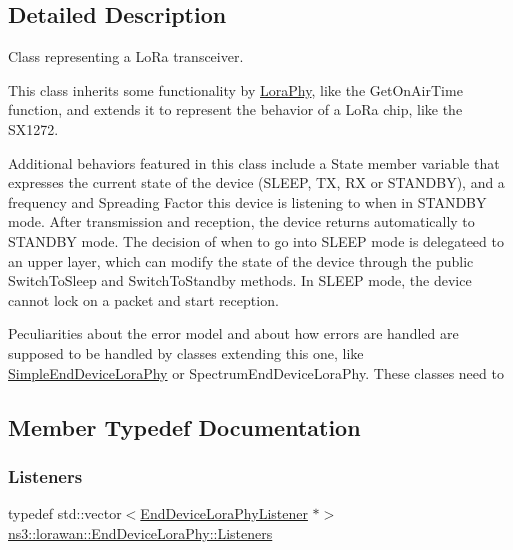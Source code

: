 \subsection{Detailed Description}
Class representing a Lo\+Ra transceiver.

This class inherits some functionality by \hyperlink{classns3_1_1lorawan_1_1LoraPhy}{Lora\+Phy}, like the Get\+On\+Air\+Time function, and extends it to represent the behavior of a Lo\+Ra chip, like the S\+X1272.

Additional behaviors featured in this class include a State member variable that expresses the current state of the device (S\+L\+E\+EP, TX, RX or S\+T\+A\+N\+D\+BY), and a frequency and Spreading Factor this device is listening to when in S\+T\+A\+N\+D\+BY mode. After transmission and reception, the device returns automatically to S\+T\+A\+N\+D\+BY mode. The decision of when to go into S\+L\+E\+EP mode is delegateed to an upper layer, which can modify the state of the device through the public Switch\+To\+Sleep and Switch\+To\+Standby methods. In S\+L\+E\+EP mode, the device cannot lock on a packet and start reception.

Peculiarities about the error model and about how errors are handled are supposed to be handled by classes extending this one, like \hyperlink{classns3_1_1lorawan_1_1SimpleEndDeviceLoraPhy}{Simple\+End\+Device\+Lora\+Phy} or Spectrum\+End\+Device\+Lora\+Phy. These classes need to 

\subsection{Member Typedef Documentation}
\mbox{\label{classns3_1_1lorawan_1_1EndDeviceLoraPhy_a2d6703f5ff4138f1a45afd26ec6223d9}} 
\subsubsection{\texorpdfstring{Listeners}{Listeners}}
{\footnotesize\ttfamily typedef std\+::vector$<$\hyperlink{classns3_1_1lorawan_1_1EndDeviceLoraPhyListener}{End\+Device\+Lora\+Phy\+Listener} $\ast$$>$ \hyperlink{classns3_1_1lorawan_1_1EndDeviceLoraPhy_a2d6703f5ff4138f1a45afd26ec6223d9}{ns3\+::lorawan\+::\+End\+Device\+Lora\+Phy\+::\+Listeners}\hspace{0.3cm}{\ttfamily [protected]}}

